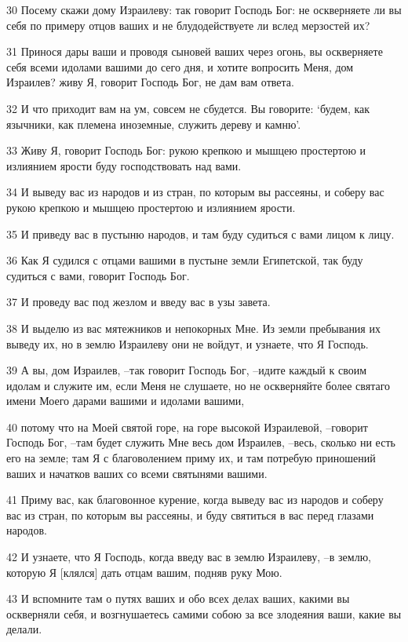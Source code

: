 \par 30 Посему скажи дому Израилеву: так говорит Господь Бог: не оскверняете ли вы себя по примеру отцов ваших и не блудодействуете ли вслед мерзостей их?
\par 31 Принося дары ваши и проводя сыновей ваших через огонь, вы оскверняете себя всеми идолами вашими до сего дня, и хотите вопросить Меня, дом Израилев? живу Я, говорит Господь Бог, не дам вам ответа.
\par 32 И что приходит вам на ум, совсем не сбудется. Вы говорите: `будем, как язычники, как племена иноземные, служить дереву и камню'.
\par 33 Живу Я, говорит Господь Бог: рукою крепкою и мышцею простертою и излиянием ярости буду господствовать над вами.
\par 34 И выведу вас из народов и из стран, по которым вы рассеяны, и соберу вас рукою крепкою и мышцею простертою и излиянием ярости.
\par 35 И приведу вас в пустыню народов, и там буду судиться с вами лицом к лицу.
\par 36 Как Я судился с отцами вашими в пустыне земли Египетской, так буду судиться с вами, говорит Господь Бог.
\par 37 И проведу вас под жезлом и введу вас в узы завета.
\par 38 И выделю из вас мятежников и непокорных Мне. Из земли пребывания их выведу их, но в землю Израилеву они не войдут, и узнаете, что Я Господь.
\par 39 А вы, дом Израилев, --так говорит Господь Бог, --идите каждый к своим идолам и служите им, если Меня не слушаете, но не оскверняйте более святаго имени Моего дарами вашими и идолами вашими,
\par 40 потому что на Моей святой горе, на горе высокой Израилевой, --говорит Господь Бог, --там будет служить Мне весь дом Израилев, --весь, сколько ни есть его на земле; там Я с благоволением приму их, и там потребую приношений ваших и начатков ваших со всеми святынями вашими.
\par 41 Приму вас, как благовонное курение, когда выведу вас из народов и соберу вас из стран, по которым вы рассеяны, и буду святиться в вас перед глазами народов.
\par 42 И узнаете, что Я Господь, когда введу вас в землю Израилеву, --в землю, которую Я [клялся] дать отцам вашим, подняв руку Мою.
\par 43 И вспомните там о путях ваших и обо всех делах ваших, какими вы оскверняли себя, и возгнушаетесь самими собою за все злодеяния ваши, какие вы делали.
